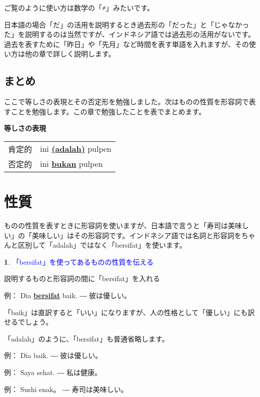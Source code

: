 \documentclass[uplatex]{jsarticle}
\theoremstyle{definition}
\newtheorem*{grammarpoint*}{}
\newcommand{\grammarpoint}[1]{
\begin{grammarpoint*}
  \textcolor{blue}{#1}
\end{grammarpoint*}
}
\newcommand{\example}[2]{
例： #1 ― #2
}
\newcommand{\bu}[1]{\underline{\textbf{#1}}}
\newcommand{\bi}[1]{\bu{#1}}
\begin{document}
ご覧のように使い方は数学の「≠」みたいです。

日本語の場合「だ」の活用を説明するとき過去形の「だった」と「じゃなかった」を説明するのは当然ですが、インドネシア語では過去形の活用がないです。過去を表すために「昨日」や「先月」など時間を表す単語を入れますが、その使い方は他の章で詳しく説明します。

\subsection*{まとめ}

ここで等しさの表現とその否定形を勉強しました。次はものの性質を形容詞で表すことを勉強します。この章で勉強したことを表でまとめます。

\textbf{等しさの表現}

\begin{tabular}{ll}
肯定的 & ini \bi{(adalah)} pulpen \\
否定的 & ini \bi{bukan} pulpen
\end{tabular}

\begin{comment}
あるものがなにかであること

状態
あるものと他のものが同じだということを伝えるのはどの言語でも基本的なことです。と言う時に、指したものは
\end{comment}

\section{性質}

ものの性質を表すときに形容詞を使いますが、日本語で言うと「寿司は美味しい」の「美味しい」はその形容詞です。インドネシア語では名詞と形容詞をちゃんと区別して「adalah」ではなく「bersifat」を使います。

\grammarpoint{「bersifat」を使ってあるものの性質を伝える}

説明するものと形容詞の間に「bersifat」を入れる

\example{Dia \bi{bersifat} baik.}{彼は優しい。}

「baik」は直訳すると「いい」になりますが、人の性格として「優しい」にも訳せるでしょう。

「adalah」のように、「bersifat」も普通省略します。

\example{Dia baik.}{彼は優しい。}

\example{Saya sehat.}{私は健康。}

\example{Sushi enak。}{寿司は美味しい。}
\end{document}
